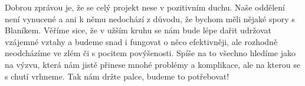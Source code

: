 Dobrou zprávou je, že se celý projekt nese v pozitivním duchu. Naše oddělení není vynucené a ani k němu nedochází z důvodu, že bychom měli nějaké spory s Blaníkem. Věříme sice, že v užším kruhu se nám bude lépe dařit udržovat vzájemné vztahy a budeme snad i fungovat o něco efektivněji, ale rozhodně neodcházíme ve zlém či s pocitem povýšenosti. Spíše na to všechno hledíme jako na výzvu, která nám jistě přinese mnohé problémy a komplikace, ale na kterou se s chutí vrhneme. Tak nám držte palce, budeme to potřebovat!


\clearpage

